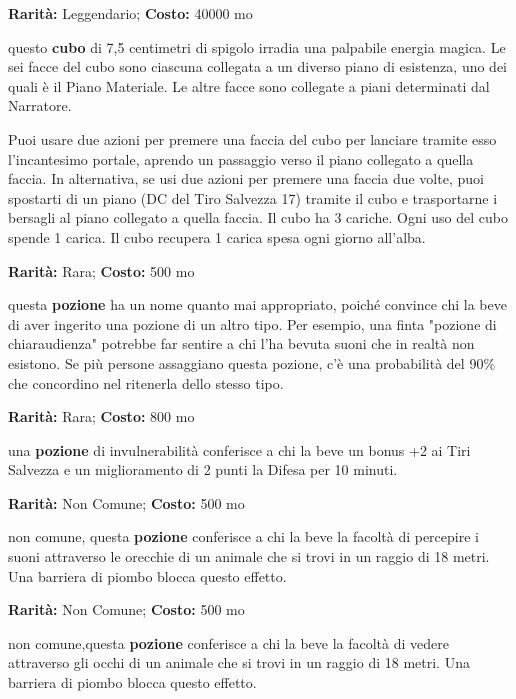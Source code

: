 \begin{multicols}{2}

\textbf{Rarità:} Leggendario; \textbf{Costo:} 40000 mo

questo \textbf{cubo} di 7,5 centimetri di spigolo irradia una palpabile energia magica. Le sei facce del cubo sono ciascuna collegata a un diverso piano di esistenza, uno dei quali è il Piano Materiale. Le altre facce sono collegate a piani determinati dal Narratore.

Puoi usare due azioni per premere una faccia del cubo per lanciare tramite esso l'incantesimo portale, aprendo un passaggio verso il piano collegato a quella faccia. In alternativa, se usi due azioni per premere una faccia due volte, puoi spostarti di un piano (DC del Tiro Salvezza 17) tramite il cubo e trasportarne i bersagli al piano collegato a quella faccia. Il cubo ha 3 cariche. Ogni uso del cubo spende 1 carica. Il cubo recupera 1 carica spesa ogni giorno all'alba.


\textbf{Rarità:} Rara; \textbf{Costo:} 500 mo

questa \textbf{pozione} ha un nome quanto mai appropriato, poiché convince chi la beve di aver ingerito una pozione di un altro tipo. Per esempio, una finta "pozione di chiaraudienza" potrebbe far sentire a chi l'ha bevuta suoni che in realtà non esistono. Se più persone assaggiano questa pozione, c'è una probabilità del 90\% che concordino nel ritenerla dello stesso tipo.


\textbf{Rarità:} Rara; \textbf{Costo:} 800 mo

una \textbf{pozione} di invulnerabilità conferisce a chi la beve un bonus +2 ai Tiri Salvezza e un miglioramento di 2 punti la Difesa per 10 minuti.


\textbf{Rarità:} Non Comune; \textbf{Costo:} 500 mo

non comune, questa \textbf{pozione} conferisce a chi la beve la facoltà di percepire i suoni attraverso le orecchie di un animale che si trovi in un raggio di 18 metri. Una barriera di piombo blocca questo effetto.


\textbf{Rarità:} Non Comune; \textbf{Costo:} 500 mo

non comune,questa \textbf{pozione} conferisce a chi la beve la facoltà di vedere attraverso gli occhi di un animale che si trovi in un raggio di 18 metri. Una barriera di piombo blocca questo effetto.


\end{multicols}
